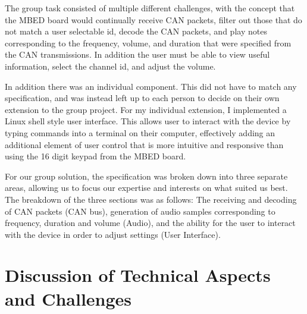 \par\bigskip\noindent
The group task consisted of multiple different challenges, with the concept
that the MBED board would continually receive CAN packets, filter out those 
that do not match a user selectable id, decode the CAN packets, and play notes 
corresponding to the frequency, volume, and duration that were specified from 
the CAN transmissions. In addition the user must be able to view useful 
information, select the channel id, and adjust the volume. 

\par\bigskip\noindent
In addition there was an individual component. This did not have to match any 
specification, and was instead left up to each person to decide on their own 
extension to the group project. For my individual extension, I implemented a 
Linux shell style user interface. This allows user to interact with the device 
by typing commands into a terminal on their computer, effectively adding an 
additional element of user control that is more intuitive and responsive than 
using the 16 digit keypad from the MBED board.

\par\bigskip\noindent
For our group solution, the specification was broken down into three separate 
areas, allowing us to focus our expertise and interests on what suited us best.
The breakdown of the three sections was as follows: The receiving and 
decoding of CAN packets (CAN bus), generation of audio samples corresponding to 
frequency, duration and volume (Audio), and the ability for the user to 
interact with the device in order to adjust settings (User Interface). 

\section{Discussion of Technical Aspects and Challenges}

